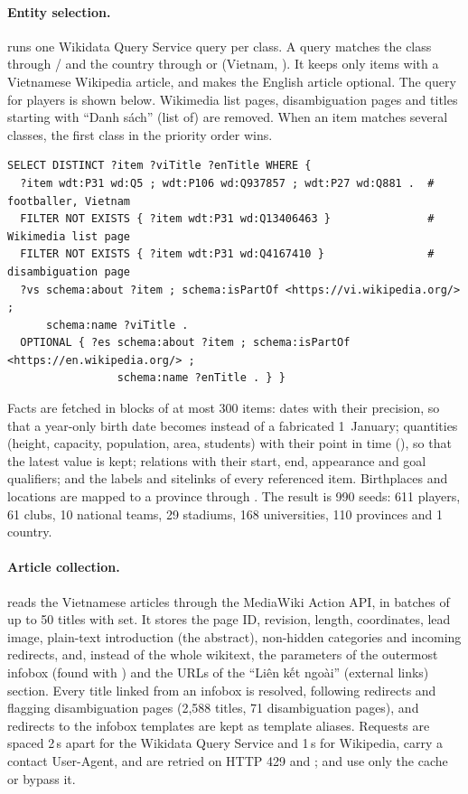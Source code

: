 \paragraph{Entity selection.}  runs one Wikidata Query Service
query per class. A query matches the class through / and
the country through  or  (Vietnam, ). It keeps
only items with a Vietnamese Wikipedia article, and makes the English article
optional. The query for players is shown below. Wikimedia list pages,
disambiguation pages and titles starting with ``Danh sách'' (list of) are
removed. When an item matches several classes, the first class in the
priority order wins.
\begin{Verbatim}
SELECT DISTINCT ?item ?viTitle ?enTitle WHERE {
  ?item wdt:P31 wd:Q5 ; wdt:P106 wd:Q937857 ; wdt:P27 wd:Q881 .  # footballer, Vietnam
  FILTER NOT EXISTS { ?item wdt:P31 wd:Q13406463 }               # Wikimedia list page
  FILTER NOT EXISTS { ?item wdt:P31 wd:Q4167410 }                # disambiguation page
  ?vs schema:about ?item ; schema:isPartOf <https://vi.wikipedia.org/> ;
      schema:name ?viTitle .
  OPTIONAL { ?es schema:about ?item ; schema:isPartOf <https://en.wikipedia.org/> ;
                 schema:name ?enTitle . } }
\end{Verbatim}
Facts are fetched in blocks of at most 300 items: dates with their precision,
so that a year-only birth date becomes  instead of a fabricated
1~January; quantities (height, capacity, population, area, students) with their
point in time (), so that the latest value is kept; relations with
their start, end, appearance and goal qualifiers; and the labels and sitelinks
of every referenced item. Birthplaces and locations are mapped to a province
through . The result is 990 seeds: 611 players, 61 clubs, 10
national teams, 29 stadiums, 168 universities, 110 provinces and 1 country.

\paragraph{Article collection.}  reads the Vietnamese articles
through the MediaWiki Action API, in batches of up to 50 titles with
 set. It stores the page ID, revision, length, coordinates, lead
image, plain-text introduction (the abstract), non-hidden categories and
incoming redirects, and, instead of the whole wikitext, the parameters of the
outermost infobox (found with ) and the URLs of the
``Liên kết ngoài'' (external links) section. Every title linked from an infobox
is resolved, following redirects and flagging disambiguation pages (2{,}588
titles, 71 disambiguation pages), and redirects to the infobox templates are
kept as template aliases. Requests are spaced 2\,s apart for the Wikidata Query
Service and 1\,s for Wikipedia, carry a contact User-Agent, and are retried
on HTTP 429 and ;  and
 use only the cache or bypass it.

